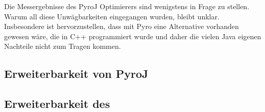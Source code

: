 Die Messergebnisse des PyroJ Optimierers sind wenigstens in Frage zu stellen. Warum all diese Unwägbarkeiten eingegangen wurden, bleibt unklar. Insbesondere ist hervorzustellen, dass mit Pyro eine Alternative vorhanden gewesen wäre, die in C++ programmiert wurde und daher die vielen Java eigenen Nachteile nicht zum Tragen kommen. 


\subsection{Erweiterbarkeit von PyroJ}




\subsection{Erweiterbarkeit des }